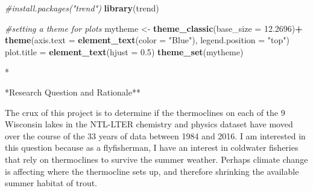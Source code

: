 \documentclass[12pt,]{article}
\newenvironment{Shaded}{\begin{snugshade}}{\end{snugshade}}
\newcommand{\KeywordTok}[1]{\textcolor[rgb]{0.13,0.29,0.53}{\textbf{#1}}}
\newcommand{\DataTypeTok}[1]{\textcolor[rgb]{0.13,0.29,0.53}{#1}}
\newcommand{\FloatTok}[1]{\textcolor[rgb]{0.00,0.00,0.81}{#1}}
\newcommand{\StringTok}[1]{\textcolor[rgb]{0.31,0.60,0.02}{#1}}
\newcommand{\CommentTok}[1]{\textcolor[rgb]{0.56,0.35,0.01}{\textit{#1}}}
\newcommand{\OperatorTok}[1]{\textcolor[rgb]{0.81,0.36,0.00}{\textbf{#1}}}
\newcommand{\NormalTok}[1]{#1}
\begin{document}
\begin{Shaded}
\begin{Highlighting}[]
\CommentTok{#install.packages("trend")}
\KeywordTok{library}\NormalTok{(trend)}

\CommentTok{#setting a theme for plots}
\NormalTok{mytheme <-}\StringTok{ }\KeywordTok{theme_classic}\NormalTok{(}\DataTypeTok{base_size =} \FloatTok{12.2696}\NormalTok{)}\OperatorTok{+}
\StringTok{  }\KeywordTok{theme}\NormalTok{(}\DataTypeTok{axis.text =} \KeywordTok{element_text}\NormalTok{(}\DataTypeTok{color =} \StringTok{"Blue"}\NormalTok{),}
  \DataTypeTok{legend.position =} \StringTok{"top"}\NormalTok{)}
\NormalTok{  plot.title =}\StringTok{ }\KeywordTok{element_text}\NormalTok{(}\DataTypeTok{hjust =} \FloatTok{0.5}\NormalTok{)}
\KeywordTok{theme_set}\NormalTok{(mytheme)}
\end{Highlighting}
\end{Shaded}

\begin{Shaded}
\end{Shaded}

\newpage
*

*Research Question and Rationale**

The crux of this project is to determine if the thermoclines on each of
the 9 Wisconsin lakes in the NTL-LTER chemistry and physics dataset have
moved over the course of the 33 years of data between 1984 and 2016. I
am interested in this question because as a flyfisherman, I have an
interest in coldwater fisheries that rely on thermoclines to survive the
summer weather. Perhaps climate change is affecting where the
thermocline sets up, and therefore shrinking the available summer
habitat of trout.
\end{document}
